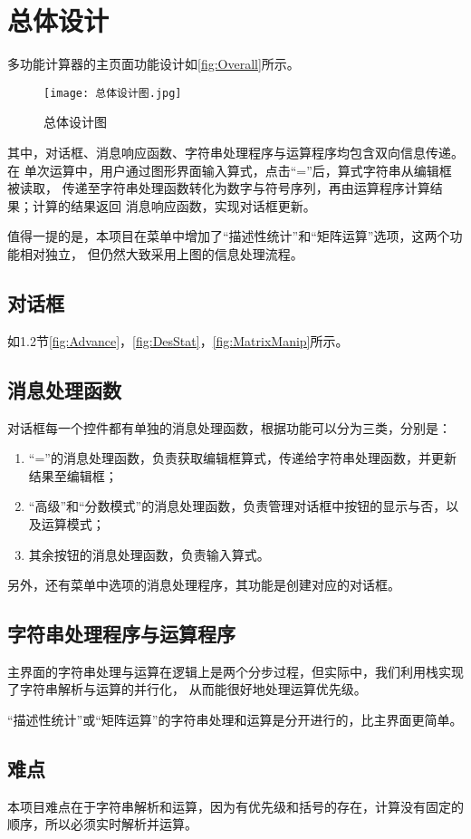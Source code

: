 \section{总体设计}

多功能计算器的主页面功能设计如\autoref{fig:Overall}所示。
\begin{figure}[!htbp]
    \centering
    \texttt{[image: 总体设计图.jpg]}
    \caption{总体设计图}
    \label{fig:Overall}
\end{figure}

其中，对话框、消息响应函数、字符串处理程序与运算程序均包含双向信息传递。在
单次运算中，用户通过图形界面输入算式，点击“=”后，算式字符串从编辑框被读取，
传递至字符串处理函数转化为数字与符号序列，再由运算程序计算结果；计算的结果返回
消息响应函数，实现对话框更新。

值得一提的是，本项目在菜单中增加了“描述性统计”和“矩阵运算”选项，这两个功能相对独立，
但仍然大致采用上图的信息处理流程。

\subsection{对话框}
如1.2节\autoref{fig:Advance}，\autoref{fig:DesStat}，\autoref{fig:MatrixManip}所示。


\subsection{消息处理函数}

对话框每一个控件都有单独的消息处理函数，根据功能可以分为三类，分别是：
\begin{enumerate}
    \item “=”的消息处理函数，负责获取编辑框算式，传递给字符串处理函数，并更新结果至编辑框；
    \item “高级”和“分数模式”的消息处理函数，负责管理对话框中按钮的显示与否，以及运算模式；
    \item 其余按钮的消息处理函数，负责输入算式。
\end{enumerate}

另外，还有菜单中选项的消息处理程序，其功能是创建对应的对话框。

\subsection{字符串处理程序与运算程序}
主界面的字符串处理与运算在逻辑上是两个分步过程，但实际中，我们利用栈实现了字符串解析与运算的并行化，
从而能很好地处理运算优先级。

“描述性统计”或“矩阵运算”的字符串处理和运算是分开进行的，比主界面更简单。

\subsection{难点}
本项目难点在于字符串解析和运算，因为有优先级和括号的存在，计算没有固定的顺序，所以必须实时解析并运算。
